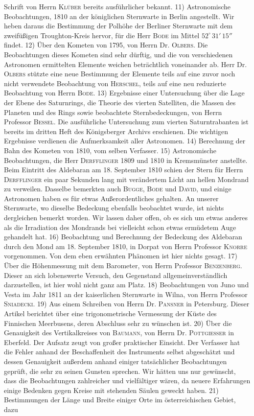 Schrift von Herrn \textsc{Klüber} bereits ausführlicher bekannt. 11) Astronomische Beobachtungen, 1810 an der königlichen Sternwarte in Berlin angestellt. Wir heben daraus die Bestimmung der Polhöhe der Berliner Sternwarte mit dem zweifüßigen Troughton-Kreis hervor, für die Herr \textsc{Bode} im Mittel $52^\circ\,31'\,15''$ findet. 12) Über den Kometen von 1795, von Herrn Dr. \textsc{Olbers}. Die Beobachtungen dieses Kometen sind sehr dürftig, und die von verschiedenen Astronomen ermittelten Elemente weichen beträchtlich voneinander ab. Herr Dr. \textsc{Olbers} stützte eine neue Bestimmung der Elemente teils auf eine zuvor noch nicht verwendete Beobachtung von \textsc{Herschel}, teils auf eine neu reduzierte Beobachtung von Herrn \textsc{Bode}. 13) Ergebnisse einer Untersuchung über die Lage der Ebene des Saturnrings, die Theorie des vierten Satelliten, die Massen des Planeten und des Rings sowie beobachtete Sternbedeckungen, von Herrn Professor \textsc{Bessel}. Die ausführliche Untersuchung zum vierten Saturntrabanten ist bereits im dritten Heft des Königsberger Archivs erschienen. Die wichtigen Ergebnisse verdienen die Aufmerksamkeit aller Astronomen. 14) Berechnung der Bahn des Kometen von 1810, vom selben Verfasser. 15) Astronomische Beobachtungen, die Herr \textsc{Derfflinger} 1809 und 1810 in Kremsmünster anstellte. Beim Eintritt des Aldebaran am 18. September 1810 schien der Stern für Herrn \textsc{Derfflinger} ein paar Sekunden lang mit verändertem Licht am hellen Mondrand zu verweilen. Dasselbe bemerkten auch \textsc{Bugge}, \textsc{Bode} und \textsc{David}, und einige Astronomen haben es für etwas Außerordentliches gehalten. An unserer Sternwarte, wo dieselbe Bedeckung ebenfalls beobachtet wurde, ist nichts dergleichen bemerkt worden. Wir lassen daher offen, ob es sich um etwas anderes als die Irradiation des Mondrands bei vielleicht schon etwas ermüdetem Auge gehandelt hat. 16) Beobachtung und Berechnung der Bedeckung des Aldebaran durch den Mond am 18. September 1810, in Dorpat von Herrn Professor \textsc{Knorre} vorgenommen. Von dem eben erwähnten Phänomen ist hier nichts gesagt. 17) Über die Höhenmessung mit dem Barometer, von Herrn Professor \textsc{Benzenberg}. Dieser an sich lobenswerte Versuch, den Gegenstand allgemeinverständlich darzustellen, ist hier wohl nicht ganz am Platz. 18) Beobachtungen von Juno und Vesta im Jahr 1811 an der kaiserlichen Sternwarte in Wilna, von Herrn Professor \textsc{Sniadecki}. 19) Aus einem Schreiben von Herrn Dr. \textsc{Pansner} in Petersburg. Dieser Artikel berichtet über eine trigonometrische Vermessung der Küste des Finnischen Meerbusens, deren Abschluss sehr zu wünschen ist. 20) Über die Genauigkeit des Vertikalkreises von \textsc{Baumann}, von Herrn Dr. \textsc{Pottgiesser} in Eberfeld. Der Aufsatz zeugt von großer praktischer Einsicht. Der Verfasser hat die Fehler anhand der Beschaffenheit des Instruments selbst abgeschätzt und dessen Genauigkeit außerdem anhand einiger tatsächlicher Beobachtungen geprüft, die sehr zu seinen Gunsten sprechen. Wir hätten uns nur gewünscht, dass die Beobachtungen zahlreicher und vielfältiger wären, da neuere Erfahrungen einige Bedenken gegen Kreise mit stehenden Säulen geweckt haben. 21) Bestimmungen der Länge und Breite einiger Orte im österreichischen Gebiet, dazu 